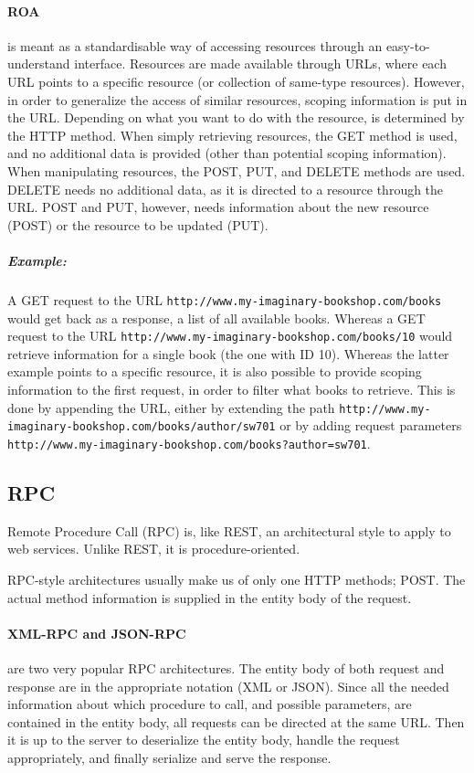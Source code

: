 \paragraph{ROA} is meant as a standardisable way of accessing resources through an easy-to-understand interface.
Resources are made available through URLs, where each URL points to a specific resource (or collection of same-type resources).
However, in order to generalize the access of similar resources, scoping information is put in the URL.
Depending on what you want to do with the resource, is determined by the HTTP method.
When simply retrieving resources, the GET method is used, and no additional data is provided (other than potential scoping information).
When manipulating resources, the POST, PUT, and DELETE methods are used.
DELETE needs no additional data, as it is directed to a resource through the URL.
POST and PUT, however, needs information about the new resource (POST) or the resource to be updated (PUT).
\subparagraph{Example:} A GET request to the URL \texttt{http://www.my-imaginary-bookshop.com/books} would get back as a response, a list of all available books.
Whereas a GET request to the URL \texttt{http://www.my-imaginary-bookshop.com/books/10} would retrieve information for a single book (the one with ID  10).
Whereas the latter example points to a specific resource, it is also possible to provide scoping information to the first request, in order to filter what books to retrieve.
This is done by appending the URL, either by extending the path \texttt{http://www.my-imaginary-bookshop.com/books/author/sw701} or by adding request parameters \texttt{http://www.my-imaginary-bookshop.com/books?author=sw701}.

\subsection{RPC}
Remote Procedure Call (RPC) is, like REST, an architectural style to apply to web services.
Unlike REST, it is procedure-oriented.

RPC-style architectures usually make us of only one HTTP methods; POST.
The actual method information is supplied in the entity body of the request.

\paragraph{XML-RPC and JSON-RPC} are two very popular RPC architectures.
The entity body of both request and response are in the appropriate notation (XML or JSON).
Since all the needed information about which procedure to call, and possible parameters, are contained in the entity body, all requests can be directed at the same URL.
Then it is up to the server to deserialize the entity body, handle the request appropriately, and finally serialize and serve the response.

